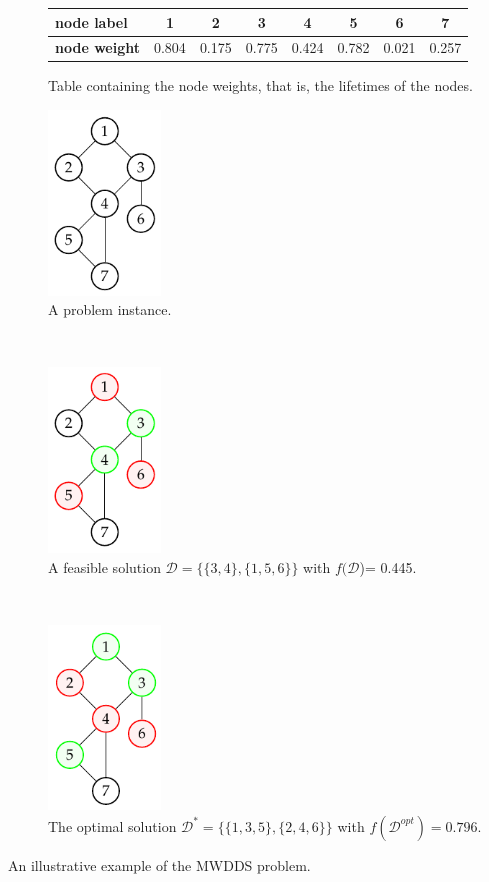 \documentclass[algorithms,article,accept,moreauthors,pdftex]{Definitions/mdpi}
\begin{document}
\begin{figure}[t]
\centering
\begin{subfigure}[t]{\linewidth}
\centering
\begin{tabular}{l||ccccccc} \hline
{\bf node label}  & 1 & 2 & 3 & 4 & 5 & 6 & 7 \\ \hline
{\bf node weight} & 0.804 & 0.175 & 0.775& 0.424 & 0.782& 0.021 & 0.257 \\ \hline
\end{tabular}
\caption[short]{Table containing the node weights, that is, the lifetimes of the nodes.}
\label{fig:1:a}
\end{subfigure}
\begin{subfigure}[t]{.3\linewidth}
\centering
 \includegraphics[width=3cm]{graphic1.pdf}
\caption[short]{A problem instance.}
\label{fig:1:b}
\end{subfigure} $\;\;\;$
\begin{subfigure}[t]{.3\linewidth}
\centering
 \includegraphics[width=3cm]{graphic2.pdf}
\caption[short]{A feasible solution $\mathcal{D}=\{\{3,4\}, \{1,5,6\}\}$ with $f(\mathcal{D}$)= 0.445.}
\label{fig:1:c}
\end{subfigure} $\;\;\;$
\begin{subfigure}[t]{.3\linewidth}
\centering
 \includegraphics[width=3cm]{graphic3.pdf}
\caption[short]{The optimal solution $\mathcal{D}^*=\{\{1,3,5\},\{2,4,6\}\} $ with $f(\mathcal{D}^{opt}) =0.796$.}
\label{fig:1:d}
\end{subfigure}
\caption{An illustrative example of the MWDDS problem.}
\label{fig:1}
\end{figure}
\end{document}
